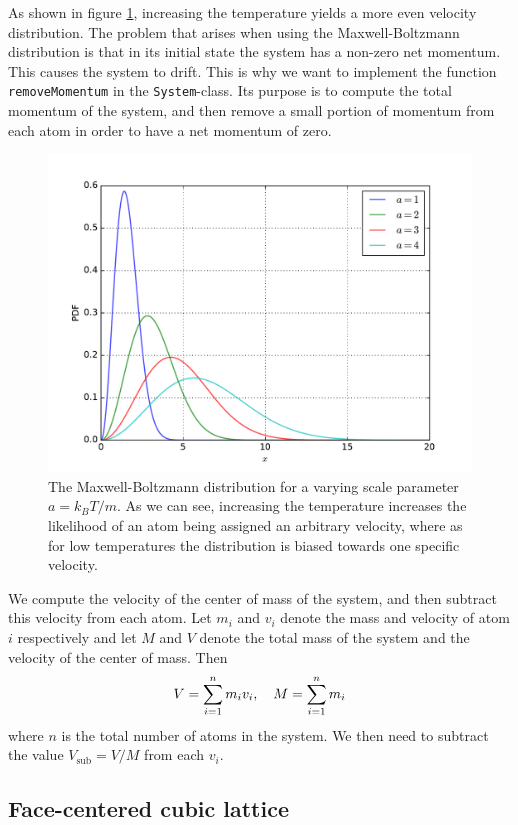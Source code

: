 \documentclass[a4paper]{article}
\begin{document}
    As shown in figure \ref{fig:maxwell_boltzmann}, increasing the temperature
    yields a more even velocity distribution. 
    The problem that arises when using the Maxwell-Boltzmann distribution is
    that in its initial state the system has a non-zero net momentum. This
    causes the system to drift. This is why we want to implement the function
    \texttt{removeMomentum} in the \texttt{System}-class. Its purpose is to
    compute the total momentum of the system, and then remove a small portion
    of momentum from each atom in order to have a net momentum of zero. 

    \begin{figure}[h]
        \centering \includegraphics[width=0.7\linewidth]{maxwell_boltzmann.pdf}
        \caption[The Maxwell-Boltzmann distribution]{The Maxwell-Boltzmann
            distribution for a varying scale parameter $a = k_BT/m$.  As we can
            see, increasing the temperature increases the likelihood of an atom
        being assigned an arbitrary velocity, where as for low temperatures the
    distribution is biased towards one specific velocity.}
        \label{fig:maxwell_boltzmann}
    \end{figure}
    We compute the velocity of the center of mass of the system, and then
    subtract this velocity from each atom.  Let $m_i$ and $v_i$ denote the mass
    and velocity of atom $i$ respectively and let $M$ and $V$ denote the total
    mass of the system and the velocity of the center of mass. Then
    \begin{align*}
        \notag
        V = \sum^{n}_{i=1} m_i v_i, \quad M = \sum^{n}_{i=1} m_i
    \end{align*}
    where $n$ is the total number of atoms in the system. We then need to
    subtract the value $V_{\mathrm{sub}} = V / M$ from each $v_i$.

\subsection{Face-centered cubic lattice}
\label{sub:face_centered_cubic_lattice}
\end{document}
